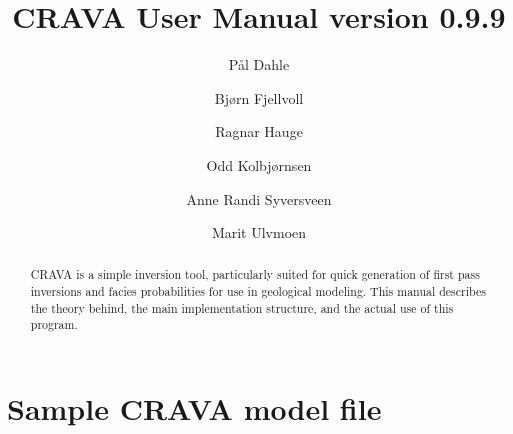 \documentclass[screen,note,long,backref,indentpar]{nrdoc}
\title{CRAVA User Manual version 0.9.9}
\author{P{\aa}l Dahle\and Bj{\o}rn Fjellvoll\and Ragnar Hauge\and Odd Kolbj{\o}rnsen\and Anne Randi Syversveen\and Marit Ulvmoen }
\newcommand{\crava} {\textsf{CRAVA}\xspace}
\begin{document}
\maketitle

\begin{abstract}
CRAVA is a simple inversion tool, particularly suited for quick generation of first pass inversions and facies probabilities for use in geological modeling. This manual describes the theory behind, the main implementation structure, and the actual use of this program.
\end{abstract}

\tableofcontents
\clearemptydoublepage



\newpage

\newpage

\newpage



\appendix


\chapter{Sample \crava model file}
\label{sec:crava-model-file}

\vspace{-2em}
\end{document}
